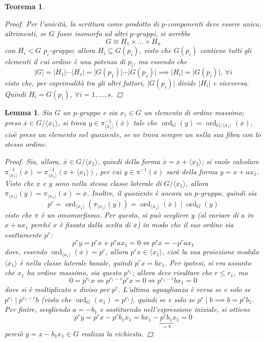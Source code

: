 \documentclass[12pt]{scrartcl}
\theoremstyle{style}
\newtheorem{teorema}{Teorema}[section]
\newtheorem{lemma}{Lemma}[teorema]
\numberwithin{equation}{subsection}
\begin{document}
\begin{teorema}
\begin{proof}
		Per l'unicit\`a, la scrittura come prodotto di $p$-componenti deve essere unica, altrimenti, se $G$ fosse isomorfo ad altri $p$-gruppi, si avrebbe
		\[
		G \cong H_1\times \ldots\times H_n
		\] 
		con $H_i<G$ $p_i$-gruppo; allora $H_i \subseteq G(p_i)$, visto che $G(p_i)$ contiene tutti gli elementi il cui ordine \`e una potenza di $p_i$, ma essendo che
		\[
		\lvert G \rvert =\lvert H_1 \rvert \cdots \lvert H_s \rvert = \lvert G(p_1) \rvert \cdots\lvert G(p_s) \rvert \implies \lvert H_i \rvert =\lvert G(p_i) \rvert , \ \forall i
		\] 
		visto che, per coprimalit\`a tra gli altri fattori, $\lvert G(p_i) \rvert  $ divide $ \lvert H_i \rvert $ e viceversa. Quindi $H_i = G(p_i), \ \forall i = 1,\ldots,s$.
\end{proof}
\end{teorema}
\begin{lemma}
	Sia $G$ un $p$-gruppo e sia $x_1\in G$ un elemento di ordine massimo; preso $\overline{x} \in G / \langle x_1 \rangle$, si trova $y \in \pi^{-1}_{\langle x_1 \rangle} (\overline{x})$ tale che $\operatorname{ord}_G(y)= \operatorname{ord}_{G/\langle x_1 \rangle} ( \overline{x})  $, cio\`e preso un elemento nel quoziente, se ne trova sempre un nella sua fibra con lo stesso ordine.
	\begin{proof}
		Sia, allora, $\overline{x}\in G / \langle x_1 \rangle$, quindi della forma $\overline{x}= x + \langle x_1 \rangle$; si vuole calcolare $\pi^{-1}_{\langle x_1 \rangle} (\overline{x}) = \pi^{-1}_{\langle x_1 \rangle} (x+\langle x_1 \rangle)$, per cui $y  \in \pi^{-1}(\overline{x})$ sar\`a della forma $y = x + ax_1$.
		Visto che $x$ e $y$ sono nella stessa classe laterale di $G / \langle x_1 \rangle$, allora $\pi_{\langle x_1 \rangle} (y) = \pi_{\langle x_1 \rangle} (x)= \overline{x}$.
		Inoltre, il quoziente \`e ancora un $p$-gruppo, quindi sia
		\[
		p^r = \operatorname{ord}_{\langle x_1 \rangle} (\pi_{\langle x_1 \rangle} (y)) =\operatorname{ord}_{\langle x_1 \rangle} (\overline{x})  \mid \operatorname{ord}_G(y) 
		\] 
		visto che $\pi$ \`e un omomorfismo.
		Per questo, si pu\`o scegliere $y$ (al variare di $a$ in $x+ ax_1$ perch\'e $x$ \`e fissato dalla scelta di $\overline{x}$) in modo che il suo ordine sia esattamente $p^r$:
		\[
		p^r y = p^r x + p^r ax_1 = 0 \iff p^r x = - p^r ax_1
		\] 
		dove, essendo $\operatorname{ord}_{\langle x_1 \rangle} (\overline{x}) =p^r$, allora $p^r x \in \langle x_1 \rangle$, cio\`e la sua proiezione modulo $\langle x_1 \rangle$ \`e nella classe laterale banale, quindi $p^rx = bx_1$.
		Per ipotesi, si era assunto che $x_1$ ha ordine massimo, sia questo $p^{r_1} $; allora deve risultare che $r\le r_1$, ma 
		\[
		0 = p^{r_1} x \iff p^{r_1-r} p^r x = 0 \iff p^{r_1-r} bx_1=0
		\] 
		dove si \`e moltiplicato e diviso per $p^r$. 
		L'ultima uguaglianza \`e versa se e solo se $p^{r_1}  \mid p^{r_1-r} b$ (visto che $\operatorname{ord}_G(x_1) =p^{r_1} $), quindi se e solo se $p^r  \mid b \implies b = p^r b_1$.
		Per finire, scegliendo $a = -b_1$  e sostituendo nell'espressione iniziale, si ottiene 
		\[
			p^r y = p^r x - p^r b_1x_1=bx_1 - \underbracket{p^r b_1}_{=b}  x_1 = 0
		\] 
		perci\`o $y= x - b_1 x_1 \in G$ realizza la richiesta.
	\end{proof}
\end{lemma}
\end{document}
